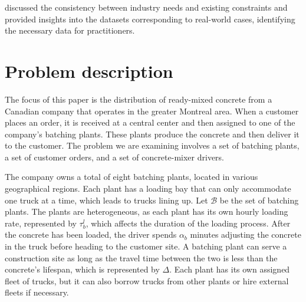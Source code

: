 \documentclass{article}
\begin{document}
discussed the consistency between industry needs and existing constraints and provided insights into the datasets corresponding to real-world cases, identifying the necessary data for practitioners. 

\section{Problem description}
\label{desc_form}
The focus of this paper is the distribution of ready-mixed concrete from a Canadian company that operates in the greater Montreal area. When a customer places an order, it is received at a central center and then assigned to one of the company's batching plants. These plants produce the concrete and then deliver it to the customer. The problem we are examining involves a set of batching plants, a set of customer orders, and a set of concrete-mixer drivers.


The company owns a total of eight batching plants, located in various geographical regions. Each plant has a loading bay that can only accommodate one truck at a time, which leads to trucks lining up. Let $\mathcal{B}$ be the set of batching plants. The plants are heterogeneous, as each plant has its own hourly loading rate, represented by $\tau^l_b$, which affects the duration of the loading process. After the concrete has been loaded, the driver spends $\alpha_b$ minutes adjusting the concrete in the truck before heading to the customer site. A batching plant can serve a construction site as long as the travel time between the two is less than the concrete's lifespan, which is represented by $\Delta$. Each plant has its own assigned fleet of trucks, but it can also borrow trucks from other plants or hire external fleets if necessary.

\end{document}
